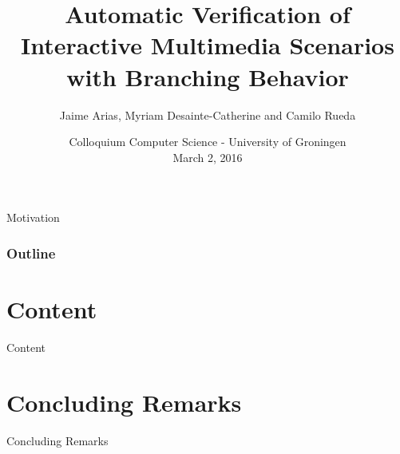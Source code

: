 \documentclass[10pt]{beamer}
\title{Automatic Verification of Interactive Multimedia Scenarios with
  Branching Behavior}
\author[Jaime Arias - LaBRI - Inria Bordeaux Sud-Ouest (2016)]{\alert{Jaime Arias}, Myriam
  Desainte-Catherine and Camilo Rueda}
\institute{Universit\'e de Bordeaux, LaBRI, UMR 5800\\ Inria - Bordeaux
  Sud-Ouest}
\date{Colloquium Computer Science - University of Groningen\\March 2, 2016}
\begin{document}

\begin{frame}[t,plain]
  \titlepage%
\end{frame}

\setcounter{framenumber}{0}



\begin{frame}{Motivation}
\end{frame}

\begin{frame}
    \frametitle{Outline}
    \tableofcontents[hideallsubsections]
\end{frame}

\section{Content}
\begin{frame}{Content}
\end{frame}

\section{Concluding Remarks}
\begin{frame}{Concluding Remarks}
\end{frame}

\appendix
\end{document}
